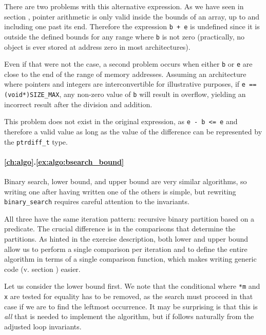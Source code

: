 There are two problems with this alternative expression.  As we have seen in
section , pointer arithmetic is only valid inside the bounds of
an array, up to and including one past its end.  Therefore the expression
\texttt{b + e} is undefined since it is outside the defined bounds for any range
where \texttt{b} is not zero (practically, no object is ever stored at address
zero in most architectures).

Even if that were not the case, a second problem occurs when either \texttt{b}
or \texttt{e} are close to the end of the range of memory addresses.  Assuming
an architecture where pointers and integers are interconvertible for
illustrative purposes, if \texttt{e == (void*)SIZE\_MAX}, any non-zero value of
\texttt{b} will result in overflow, yielding an incorrect result after the
division and addition.

This problem does not exist in the original expression, as \texttt{e - b <= e}
and therefore a valid value as long as the value of the difference can be
represented by the \texttt{ptrdiff\_t} type.

\paragraph{\ref{ch:algo}.\ref{ex:algo:bsearch_bound}}

Binary search, lower bound, and upper bound are very similar algorithms, so
writing one after having written one of the others is simple, but rewriting
\texttt{binary\_search} requires careful attention to the invariants.

All three have the same iteration pattern: recursive binary partition based on a
predicate.  The crucial difference is in the comparisons that determine the
partitions.  As hinted in the exercise description, both lower and upper bound
allow us to perform a single comparison per iteration and to define the entire
algorithm in terms of a single comparison function, which makes writing generic
code (v. section ) easier.

Let us consider the lower bound first.  We note that the conditional where
\texttt{*m} and \texttt{x} are tested for equality has to be removed, as the
search must proceed in that case if we are to find the leftmost occurrence.  It
may be surprising is that this is \emph{all} that is needed to implement the
algorithm, but if follows naturally from the adjusted loop invariants.



